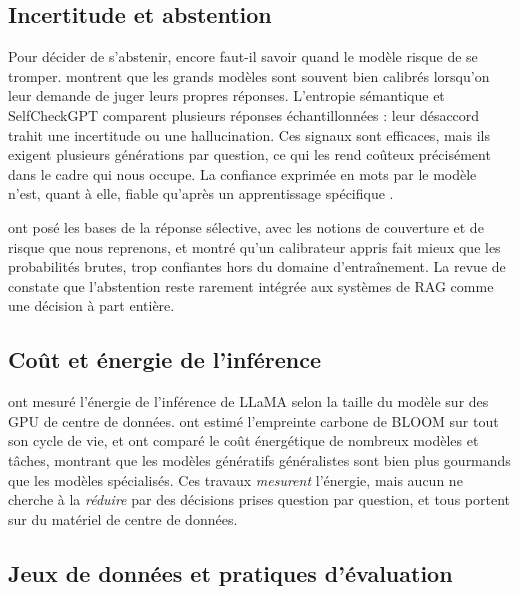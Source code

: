 \documentclass[11pt,a4paper]{article}
\begin{document}
\subsection{Incertitude et abstention}

Pour décider de s'abstenir, encore faut-il savoir quand le modèle risque de se tromper.
\citet{kadavath2022know} montrent que les grands modèles sont souvent bien calibrés lorsqu'on leur
demande de juger leurs propres réponses. L'entropie sémantique \citep{kuhn2023semantic} et SelfCheckGPT
\citep{manakul2023selfcheckgpt} comparent plusieurs réponses échantillonnées : leur désaccord trahit une
incertitude ou une hallucination. Ces signaux sont efficaces, mais ils exigent plusieurs générations par
question, ce qui les rend coûteux précisément dans le cadre qui nous occupe. La confiance exprimée en
mots par le modèle n'est, quant à elle, fiable qu'après un apprentissage spécifique
\citep{lin2022verbal}.

\citet{kamath2020selective} ont posé les bases de la réponse sélective, avec les notions de couverture
et de risque que nous reprenons, et montré qu'un calibrateur appris fait mieux que les probabilités
brutes, trop confiantes hors du domaine d'entraînement. La revue de \citet{wen2024abstention} constate
que l'abstention reste rarement intégrée aux systèmes de RAG comme une décision à part entière.

\subsection{Coût et énergie de l'inférence}

\citet{samsi2023watts} ont mesuré l'énergie de l'inférence de LLaMA selon la taille du modèle sur des
GPU de centre de données. \citet{luccioni2022bloom} ont estimé l'empreinte carbone de BLOOM sur tout son
cycle de vie, et \citet{luccioni2024power} ont comparé le coût énergétique de nombreux modèles et
tâches, montrant que les modèles génératifs généralistes sont bien plus gourmands que les modèles
spécialisés. Ces travaux \emph{mesurent} l'énergie, mais aucun ne cherche à la \emph{réduire} par des
décisions prises question par question, et tous portent sur du matériel de centre de données.

\subsection{Jeux de données et pratiques d'évaluation}
\end{document}
